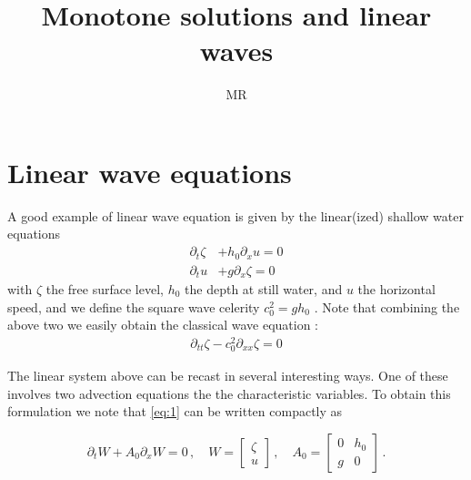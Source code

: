 \documentclass[10pt]{article}
\begin{document}
%
%
%
\title{Monotone solutions and linear waves}
%
%
%
\author{MR}
%
%
%
\date{}
%
%
%
\maketitle
%
%
%
%
%
%


\section{Linear wave equations}

A good example of linear wave equation is given by  the  linear(ized) shallow water equations 
\begin{equation}\label{eq:1}
\begin{split}
\partial_t  \zeta &+ h_0 \partial_x u   =0\\
\partial_t u &+ g \partial_x\zeta = 0
\end{split}
\end{equation}
 with $\zeta$ the free surface level, $h_0$ the depth at still water, and $u$ the horizontal speed, and we define the square wave celerity $c_0^2=gh_0$ .
 Note that combining the above two we easily obtain the classical wave equation :
\begin{equation}\label{eq:1a}
\begin{split}
\partial_{tt} \zeta - c^2_0  \partial_{xx}\zeta    =0
\end{split}
\end{equation}

 The linear system above can be recast in several interesting ways. One of these involves  two advection equations  the the characteristic variables. 
 To obtain this formulation we note that \eqref{eq:1} can be written compactly as
 
 \begin{equation}\label{eq:2}
\partial_t  W +    A_0 \partial_x W   =0\,,\quad
W=\left[\begin{array}{c} \zeta\\ u
\end{array}\right]\,,\quad
A_0=\left[\begin{array}{cc} 0 &  h_0\\
g&0
\end{array}\right]\,.
\end{equation}
\end{document}

